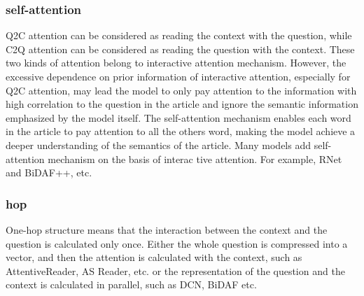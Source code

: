 \subsubsection{self-attention}
Q2C attention can be considered as reading the context with the question, while C2Q attention can be considered as reading the question with the context. 
These two kinds of attention belong to interactive attention mechanism. However, the excessive dependence on prior information of interactive attention, especially for Q2C attention, may lead the model to 
only pay attention to the information with high correlation to the question in the article and ignore the semantic information emphasized by the model itself. 
The self-attention mechanism enables each word in the article to pay attention to all the others word, making the model achieve a deeper understanding of the semantics of the article. 
Many models add self-attention mechanism on the basis of interac
tive attention. For example, RNet and BiDAF++, etc.
\subsubsection{hop}
One-hop structure means that the interaction between the context and the question is calculated only once. Either the whole question is compressed into a vector, and then the attention is calculated with the context, such as AttentiveReader, AS Reader, etc. or the 
representation of the question and the context is calculated in parallel, such as DCN, BiDAF etc. 

